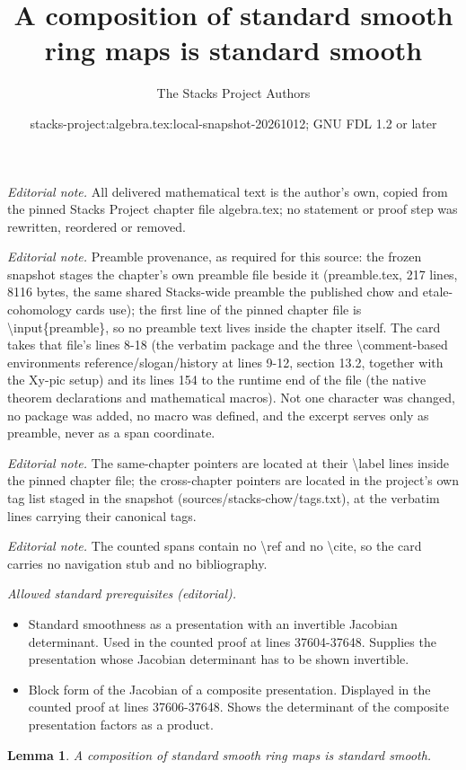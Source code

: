 \documentclass[10pt,a4paper]{amsart}
\title{A composition of standard smooth ring maps is standard smooth}
\author{The Stacks Project Authors}
\date{stacks-project:algebra.tex:local-snapshot-20261012; GNU FDL 1.2 or later}
\theoremstyle{plain}
\newtheorem{lemma}[subsection]{Lemma}
\theoremstyle{definition}
\theoremstyle{remark}
\numberwithin{equation}{subsection}
\begin{document}
\maketitle
\noindent\textit{Editorial note.} All delivered mathematical text is the author's own, copied from the pinned Stacks Project chapter file algebra.tex; no statement or proof step was rewritten, reordered or removed.\par\medskip
\noindent\textit{Editorial note.} Preamble provenance, as required for this source: the frozen snapshot stages the chapter's own preamble file beside it (preamble.tex, 217 lines, 8116 bytes, the same shared Stacks-wide preamble the published chow and etale-cohomology cards use); the first line of the pinned chapter file is \textbackslash{}input\{preamble\}, so no preamble text lives inside the chapter itself. The card takes that file's lines 8-18 (the verbatim package and the three \textbackslash{}comment-based environments reference/slogan/history at lines 9-12, section 13.2, together with the Xy-pic setup) and its lines 154 to the runtime end of the file (the native theorem declarations and mathematical macros). Not one character was changed, no package was added, no macro was defined, and the excerpt serves only as preamble, never as a span coordinate.\par\medskip
\noindent\textit{Editorial note.} The same-chapter pointers are located at their \textbackslash{}label lines inside the pinned chapter file; the cross-chapter pointers are located in the project's own tag list staged in the snapshot (sources/stacks-chow/tags.txt), at the verbatim lines carrying their canonical tags.\par\medskip
\noindent\textit{Editorial note.} The counted spans contain no \textbackslash{}ref and no \textbackslash{}cite, so the card carries no navigation stub and no bibliography.\par\medskip
\noindent\textit{Allowed standard prerequisites (editorial).}\begin{itemize}
\item Standard smoothness as a presentation with an invertible Jacobian determinant. Used in the counted proof at lines 37604-37648. Supplies the presentation whose Jacobian determinant has to be shown invertible.
\item Block form of the Jacobian of a composite presentation. Displayed in the counted proof at lines 37606-37648. Shows the determinant of the composite presentation factors as a product.
\end{itemize}\medskip
\begin{lemma}
\label{lemma-compose-standard-smooth}
A composition of standard smooth ring maps is standard smooth.
\end{lemma}
\end{document}

